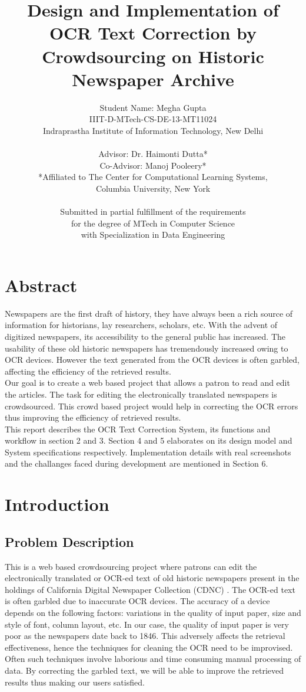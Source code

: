 \documentclass[amsart, 12pt]{article}
\title{Design and Implementation of OCR Text Correction by Crowdsourcing on Historic Newspaper Archive}
\author{Student Name: Megha Gupta\\
IIIT-D-MTech-CS-DE-13-MT11024\\
Indraprastha Institute of Information Technology,
New Delhi\\
\\
Advisor: Dr. Haimonti Dutta* \\
Co-Advisor: Manoj Pooleery* \\
*Affiliated to The Center for Computational Learning Systems,\\
Columbia University, New York\\
\\
Submitted in partial fulfillment of the requirements\\
for the degree of MTech in Computer Science\\
with Specialization in Data Engineering\\}
\begin{document}
\maketitle
\newpage
\section{Abstract}
Newspapers are the first draft of history, they have always been a rich source of information for historians, lay researchers, scholars, etc. With the advent of digitized newspapers, its accessibility to the general public has increased. 
The usability of these old historic newspapers has tremendously increased owing to OCR devices. However the text generated from the OCR devices is often garbled, affecting the efficiency of the retrieved results.\\
Our goal is to create a web based project that allows a patron to read and edit the articles. The task for editing the electronically translated newspapers is crowdsourced. This crowd based project would help in correcting the OCR errors thus improving the efficiency of retrieved results.\\
This report describes the OCR Text Correction System, its functions and workflow in section 2 and 3. Section 4 and 5 elaborates on its design model and System specifications respectively. Implementation details with real screenshots and the challanges faced during development are mentioned in Section 6.

\newpage
\tableofcontents

\newpage
\section{Introduction}

\subsection{Problem Description}
This is a web based crowdsourcing project where patrons can edit the electronically translated or OCR-ed text of old historic newspapers present in the holdings of California Digital Newspaper Collection (CDNC) \cite{cdnc}. The OCR-ed text is often garbled due to inaccurate OCR devices. The accuracy of a device depends on the following factors: variations in the quality of input paper, size and style of font, column layout, etc. In our case, the quality of input paper is very poor as the newspapers date back to 1846. This adversely affects the retrieval effectiveness, hence the techniques for cleaning the OCR \cite{OCR} need to be improvised. Often such techniques involve laborious and time consuming manual processing of data. By correcting the garbled text, we will be able to improve the retrieved results thus making our users satisfied. \\
\end{document}
